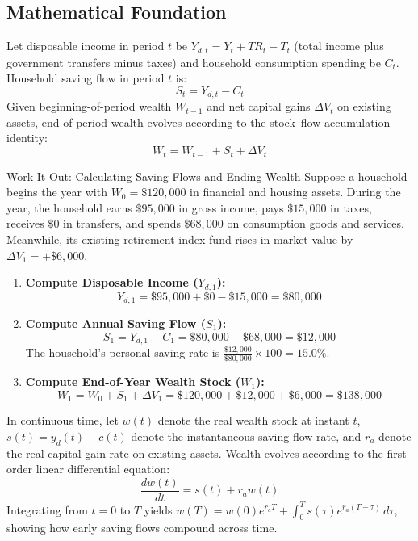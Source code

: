 \documentclass[11pt,letterpaper]{article}
\begin{document}
\subsection*{Mathematical Foundation}
Let disposable income in period $t$ be $Y_{d,t} = Y_t + TR_t - T_t$ (total income plus government transfers minus taxes) and household consumption spending be $C_t$. Household saving flow in period $t$ is:
\begin{equation}
S_t = Y_{d,t} - C_t
\end{equation}
Given beginning-of-period wealth $W_{t-1}$ and net capital gains $\Delta V_t$ on existing assets, end-of-period wealth evolves according to the stock--flow accumulation identity:
\begin{equation}
W_t = W_{t-1} + S_t + \Delta V_t
\end{equation}

\begin{examplecase}{Work It Out: Calculating Saving Flows and Ending Wealth}
Suppose a household begins the year with $W_0 = \$120{,}000$ in financial and housing assets. During the year, the household earns $\$95{,}000$ in gross income, pays $\$15{,}000$ in taxes, receives $\$0$ in transfers, and spends $\$68{,}000$ on consumption goods and services. Meanwhile, its existing retirement index fund rises in market value by $\Delta V_1 = +\$6{,}000$.
\begin{enumerate}
  \item \textbf{Compute Disposable Income ($Y_{d,1}$):}
  $$Y_{d,1} = \$95{,}000 + \$0 - \$15{,}000 = \$80{,}000$$
  \item \textbf{Compute Annual Saving Flow ($S_1$):}
  $$S_1 = Y_{d,1} - C_1 = \$80{,}000 - \$68{,}000 = \$12{,}000$$
  The household's personal saving rate is $\frac{\$12{,}000}{\$80{,}000} \times 100 = 15.0\%$.
  \item \textbf{Compute End-of-Year Wealth Stock ($W_1$):}
  $$W_1 = W_0 + S_1 + \Delta V_1 = \$120{,}000 + \$12{,}000 + \$6{,}000 = \$138{,}000$$
\end{enumerate}
\end{examplecase}

\begin{coreprinciple}
In continuous time, let $w(t)$ denote the real wealth stock at instant $t$, $s(t) = y_d(t) - c(t)$ denote the instantaneous saving flow rate, and $r_a$ denote the real capital-gain rate on existing assets. Wealth evolves according to the first-order linear differential equation:
$$\frac{dw(t)}{dt} = s(t) + r_a w(t)$$
Integrating from $t = 0$ to $T$ yields $w(T) = w(0)e^{r_a T} + \int_0^T s(\tau)e^{r_a(T-\tau)}\,d\tau$, showing how early saving flows compound across time.
\end{coreprinciple}
\end{document}
